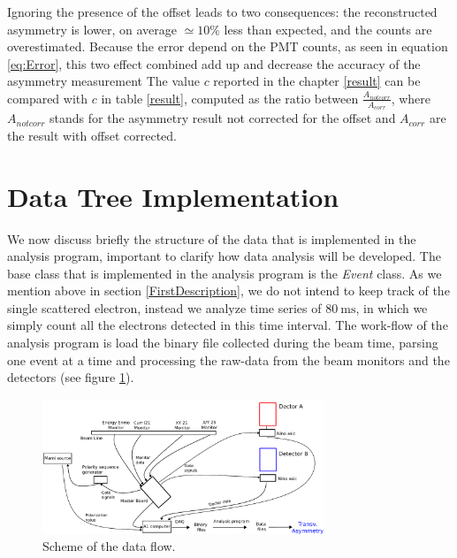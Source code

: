Ignoring the presence of the offset leads to two consequences: the reconstructed asymmetry is lower, on average $ \simeq 10\%$ less than expected, and the counts are overestimated. Because the error depend on the PMT counts, as seen in equation \ref{eq:Error}, this two effect combined add up and decrease the accuracy of the asymmetry measurement
The value $c$ reported in the chapter \ref{result} can be compared with $c$ in table \ref{result}, computed as the ratio between $\frac{A_{not corr}}{A_{corr}}$, where $A_{not corr}$ stands for the asymmetry result not corrected for the offset and $A_{corr}$ are the result with offset corrected. 

\section{Data Tree Implementation}

We now discuss briefly the structure of the data that is implemented in the analysis program, important to clarify how data analysis will be developed.
The base class that is implemented in the analysis program is the \textit{Event} class. As we mention above in section \ref{FirstDescription}, we do not intend to keep track of the single scattered electron, instead we analyze time series of $\SI{80}{\milli \second}$, in which we simply count all the electrons detected in this time interval. The work-flow of the analysis program is load the binary file collected during the beam time, parsing  one event at a time and processing the raw-data from the beam monitors and the detectors (see figure \ref{fig:DataFlow}). 

\begin{figure}[!hbtp]
\centering
\includegraphics[width = 0.75\textwidth]{Analysis/Electronic_scheme.pdf}
\caption{Scheme of the data flow.}
\label{fig:DataFlow}
\end{figure}

